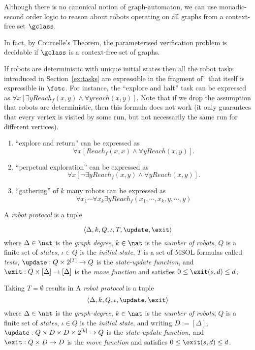 \begin{enumerate}
 Although there is no canonical notion of graph-automaton, we can use
monadic-second order logic to reason about robots operating on all graphs from a
context-free set $\gclass$.

In fact, by Courcelle's Theorem, the parameterised verification problem is
decidable if $\gclass$ is a context-free set of graphs.

\end{enumerate}




If robots are deterministic with unique initial states then all the robot tasks
introduced in Section~\ref{ex:tasks} are expressible in the fragment of \MRTL\
that itself is expressible in $\fotc$. For instance, the ``explore and halt''
task can be expressed as $\forall x [\exists y Reach_f(x,y) \wedge \forall y
reach(x,y)]$. Note that if we drop the assumption that robots are deterministic,
then this formula does not work (it only guarantees that every vertex is visited
by some run, but not necessarily the same run for different vertices).

\begin{enumerate}
\item ``explore and return'' can be expressed as
\[
\forall x [ Reach_f(x,x) \wedge \forall y Reach(x,y)].
\]
\item ``perpetual exploration'' can be expressed as
\[
\forall x [\neg \exists y Reach_f(x,y) \wedge \forall y Reach(x,y)].
\]

\item ``gathering'' of $k$ many robots can be expressed as
\[
\forall x_1 \cdots \forall x_k \exists y Reach_f(x_1,\cdots,x_k,y,\cdots,y)
\]
\end{enumerate}



A {\em robot protocol} is a tuple

\[
\left< \Delta,k,Q,\iota,T, \update,\exit \right>
\]
where $\Delta \in \nat$ is the {\em graph degree}, $k \in \nat$ is the {\em
number of robots}, $Q$ is a finite set of {\em states}, $\iota \in Q$ is the
{\em initial state}, $T$ is a set of MSOL formulas called {\em tests}, $
\update:Q \times 2^{[T]} \to Q$ is the {\em state-update function}, and $\exit:Q
\times [\Delta] \to [\Delta]$ is the {\em move function} and satisfies $0 \leq
\exit(s,d) \leq d$.

Taking $T = \emptyset$ results in
A {\em robot protocol} is a tuple
\[
\left<\Delta,k,Q,\iota, \update,\exit\right>
\]
where $\Delta \in \nat$ is the {\em graph-degree}, $k \in \nat$ is the {\em
number of robots}, $Q$ is a finite set of {\em states}, $\iota \in Q$ is the
{\em initial state}, and writing $D := [\Delta]$, $ \update:Q \times D \times D
\times 2^{[k]} \to Q$ is the {\em state-update function}, and $\exit:Q \times D
\to D$ is the {\em move function} and satisfies $0 \leq \exit(s,d) \leq d$.

